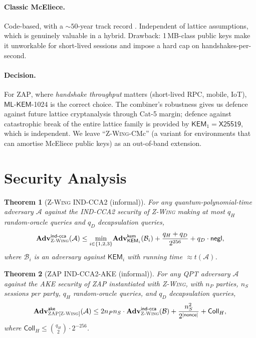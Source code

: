\documentclass[11pt,a4paper]{article}
\newtheorem{theorem}{Theorem}
\theoremstyle{definition}
\theoremstyle{remark}
\newcommand{\KEM}{\ensuremath{\mathsf{KEM}}}
\newcommand{\Adv}{\ensuremath{\mathbf{Adv}}}
\newcommand{\negl}{\ensuremath{\mathsf{negl}}}
\newcommand{\zwing}{\textsc{Z-Wing}}
\newcommand{\zap}{\textsc{ZAP}}
\newcommand{\mlkem}{\ensuremath{\mathsf{ML\text{-}KEM}}}
\newcommand{\xtf}{\ensuremath{\mathsf{X25519}}}
\begin{document}
\paragraph{Classic McEliece.} Code-based, with a $\sim 50$-year track record
\cite{mceliece1978,classicmceliece}. Independent of lattice assumptions,
which is genuinely valuable in a hybrid. Drawback: 1\,MB-class public keys
make it unworkable for short-lived sessions and impose a hard cap on
handshakes-per-second.

\paragraph{Decision.} For \zap{}, where \emph{handshake throughput} matters
(short-lived RPC, mobile, IoT), \mlkem{}-1024 is the correct choice. The
combiner's robustness gives us defence against future lattice cryptanalysis
through Cat-5 margin; defence against catastrophic break of the entire lattice
family is provided by $\KEM_1 = \xtf{}$, which is independent. We leave
``\zwing{}-CMc'' (a variant for environments that can amortise McEliece
public keys) as an out-of-band extension.

\section{Security Analysis}\label{sec:security}

\begin{theorem}[\zwing{} IND-CCA2 (informal)]\label{thm:zwingcca}
For any quantum-polynomial-time adversary $\mathcal{A}$ against the
IND-CCA2 security of \zwing{} making at most $q_H$ random-oracle queries
and $q_D$ decapsulation queries,
\[
\Adv^{\mathsf{ind\text{-}cca}}_{\zwing}(\mathcal{A}) \le
\min_{i \in \{1,2,3\}}\!\Adv^{\mathsf{kem}}_{\KEM_i}(\mathcal{B}_i)
+ \frac{q_H + q_D}{2^{256}} + q_D \cdot \negl,
\]
where $\mathcal{B}_i$ is an adversary against $\KEM_i$ with running time
$\approx t(\mathcal{A})$.
\end{theorem}

\begin{theorem}[\zap{} IND-CCA2-AKE (informal)]\label{thm:ake}
For any QPT adversary $\mathcal{A}$ against the AKE security of \zap{}
instantiated with \zwing{}, with $n_P$ parties, $n_S$ sessions per party,
$q_H$ random-oracle queries, and $q_D$ decapsulation queries,
\[
\Adv^{\mathsf{ake}}_{\zap[\zwing]}(\mathcal{A}) \le
2 n_P n_S \cdot \Adv^{\mathsf{ind\text{-}cca}}_{\zwing}(\mathcal{B})
+ \frac{n_S^2}{2^{|\mathsf{nonce}|}}
+ \mathsf{Coll}_H,
\]
where $\mathsf{Coll}_H \le \binom{q_H}{2} \cdot 2^{-256}$.
\end{theorem}
\end{document}
